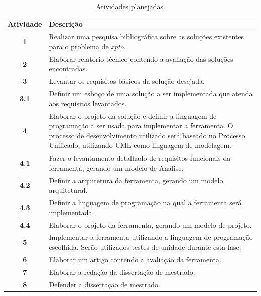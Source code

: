 \documentclass[a4paper,titlepage,12pt]{article}
\begin{document}
\begin{table}[H]
\caption{Atividades planejadas.}
\label{tab:atividades}
 \small
  \begin{center}
    \begin{tabular}{|c||p{13cm}|} \hline
      {\bf Atividade}   &{\bf Descrição} \\\hline
      {\bf 1}   & Realizar uma pesquisa bibliográfica sobre as soluções existentes para o problema de \textit{xpto}.  \\\hline
      {\bf 2}   & Elaborar relatório técnico contendo a avaliação das soluções encontradas. \\\hline
      {\bf 3}   & Levantar os requisitos básicos da solução desejada. \\\hline
      {\bf 3.1}   & Definir um esboço de uma solução a ser implementada que atenda aos requisitos levantados. \\\hline
      {\bf 4}   & Elaborar o projeto da solução e definir a linguagem de programação a ser usada para implementar a ferramenta. O processo de desenvolvimento utilizado será baseado no Processo Unificado, utilizando UML como linguagem de modelagem. \\\hline
      {\bf 4.1}   & Fazer o levantamento detalhado de requisitos funcionais da ferramenta, gerando um modelo de Análise. \\\hline
      {\bf 4.2}   & Definir a arquitetura da ferramenta, gerando um modelo arquitetural. \\\hline
      {\bf 4.3}   & Definir a linguagem de programação na qual a ferramenta será implementada. \\\hline
      {\bf 4.4}   & Elaborar o projeto da ferramenta, gerando um modelo de projeto. \\\hline
      {\bf 5}  & Implementar a ferramenta utilizando a linguagem de programação escolhida. Serão utilizados testes de unidade durante esta fase. \\\hline
      {\bf 6}  & Elaborar um artigo contendo a avaliação da ferramenta. \\\hline
      {\bf 7}  & Elaborar a redação da dissertação de mestrado. \\\hline
      {\bf 8}  & Defender a dissertação de mestrado. \\\hline
    \end{tabular}
  \end{center}
\end{table}

\newpage
\end{document}
